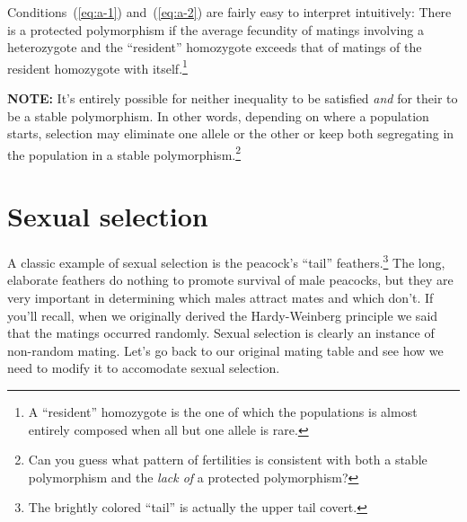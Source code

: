 \documentclass[12pt]{article}
\begin{document}
Conditions~(\ref{eq:a-1}) and~(\ref{eq:a-2}) are fairly easy to
interpret intuitively: There is a protected polymorphism if the
average fecundity of matings involving a heterozygote and the
``resident'' homozygote exceeds that of matings of the resident
homozygote with itself.\footnote{A ``resident'' homozygote is the one
  of which the populations is almost entirely composed when all but
  one allele is rare.}

{\bf NOTE:} It's entirely possible for neither inequality to be
satisfied {\it and\/} for their to be a stable polymorphism. In other
words, depending on where a population starts, selection may eliminate
one allele or the other or keep both segregating in the population in
a stable polymorphism.\footnote{Can you guess what pattern of
  fertilities is consistent with both a stable polymorphism and the
  {\it lack of\/} a protected polymorphism?}

\section*{Sexual selection}

A classic example of sexual selection is the peacock's ``tail''
feathers.\footnote{The brightly colored ``tail'' is actually the upper
  tail covert.} The long, elaborate feathers do nothing to promote
survival of male peacocks, but they are very important in determining
which males attract mates and which don't. If you'll recall, when we
originally derived the Hardy-Weinberg principle we said that the
matings occurred randomly. Sexual selection is clearly an instance of
non-random mating. Let's go back to our original mating table and see
how we need to modify it to accomodate sexual selection.
\end{document}
